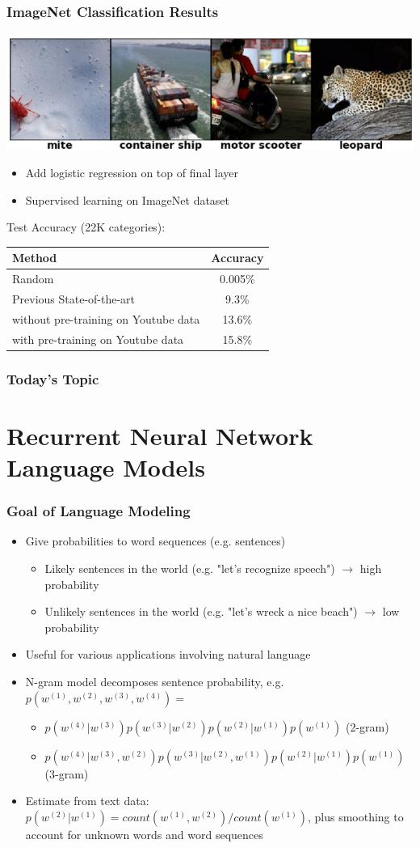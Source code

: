 \documentclass{beamer}
\newcommand{\bi}{\begin{itemize}}
\newcommand{\ei}{\end{itemize}}
\begin{document}
\begin{frame}
\frametitle{ImageNet Classification Results}
\centerline{\includegraphics[scale=0.4]{figs/imagenet}}
\bi
\item Add logistic regression on top of final layer
\item Supervised learning on ImageNet dataset
\ei

Test Accuracy (22K categories):\\
\begin{tabular}{|l|c|}
\hline
Method & Accuracy \\ \hline
Random & 0.005\% \\
Previous State-of-the-art & 9.3\% \\
\cite{le12highlevel} without pre-training on Youtube data & 13.6\% \\
\cite{le12highlevel} with pre-training on Youtube data & 15.8\% \\
\hline
\end{tabular}
\end{frame}

\begin{frame}
\frametitle{Today's Topic}
\tableofcontents
\end{frame}

\section{Recurrent Neural Network Language Models \cite{mikolov10rnnlm}}

\begin{frame}
\frametitle{Goal of Language Modeling}
\bi
\item Give probabilities to word sequences (e.g. sentences)
\bi
	\item Likely sentences in the world (e.g. "let's recognize speech") $\rightarrow$ high probability
	\item Unlikely sentences in the world (e.g. "let's wreck a nice beach") $\rightarrow$ low probability
\ei
\item Useful for various applications involving natural language
\pause
\item N-gram model decomposes sentence probability, e.g. $p(w^{(1)},w^{(2)},w^{(3)},w^{(4)})=$
\bi
\item $p(w^{(4)}|w^{(3)})p(w^{(3)}|w^{(2)})p(w^{(2)}|w^{(1)})p(w^{(1)})$ (2-gram)
\item $p(w^{(4)}|w^{(3)},w^{(2)})p(w^{(3)}|w^{(2)},w^{(1)})p(w^{(2)}|w^{(1)})p(w^{(1)})$ (3-gram)
\ei
\pause
\item Estimate from text data: $p(w^{(2)}|w^{(1)}) = count(w^{(1)},w^{(2)})/count(w^{(1)}) $, plus smoothing to account for unknown words and word sequences
\ei
\end{frame}
\end{document}

